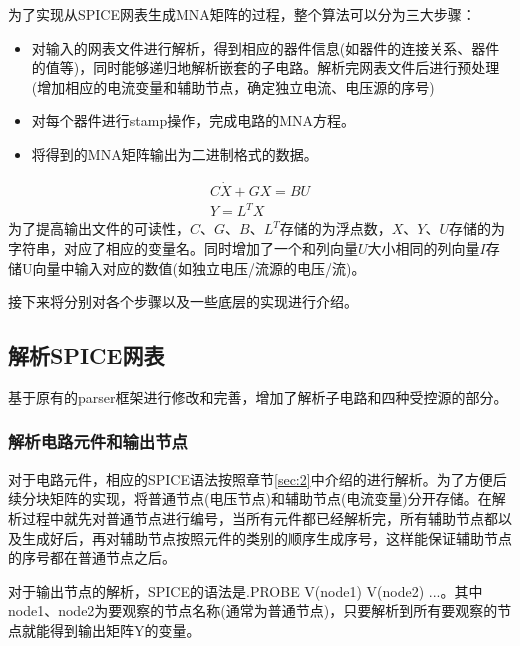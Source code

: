 \documentclass[12pt]{article}
\begin{document}
\qquad 为了实现从SPICE网表生成MNA矩阵的过程，整个算法可以分为三大步骤：\par
\begin{itemize}
  \item 对输入的网表文件进行解析，得到相应的器件信息(如器件的连接关系、器件的值等)，同时能够递归地解析嵌套的子电路。解析完网表文件后进行预处理(增加相应的电流变量和辅助节点，确定独立电流、电压源的序号)
  \item 对每个器件进行stamp操作，完成电路的MNA方程。
  \item 将得到的MNA矩阵输出为二进制格式的数据。
\end{itemize}
\begin{gather*}
C \dot{X}+G X=B U \\
Y=L^T X 
\end{gather*}
\quad 为了提高输出文件的可读性，$C、G、B、L^T$存储的为浮点数，$X、Y、U$存储的为字符串，对应了相应的变量名。同时增加了一个和列向量$U$大小相同的列向量$I$存储U向量中输入对应的数值(如独立电压/流源的电压/流)。\par
\qquad 接下来将分别对各个步骤以及一些底层的实现进行介绍。\par


\subsection{解析SPICE网表}
\qquad 基于原有的parser框架进行修改和完善，增加了解析子电路和四种受控源的部分。 \par

\subsubsection{解析电路元件和输出节点}
\qquad 对于电路元件，相应的SPICE语法按照章节\ref{sec:2}中介绍的进行解析。为了方便后续分块矩阵的实现，将普通节点(电压节点)和辅助节点(电流变量)分开存储。在解析过程中就先对普通节点进行编号，当所有元件都已经解析完，所有辅助节点都以及生成好后，再对辅助节点按照元件的类别的顺序生成序号，这样能保证辅助节点的序号都在普通节点之后。\par
\qquad 对于输出节点的解析，SPICE的语法是\quad .PROBE \quad V(node1) \quad V(node2) ...。其中node1、node2为要观察的节点名称(通常为普通节点)，只要解析到所有要观察的节点就能得到输出矩阵Y的变量。\par
\end{document}
